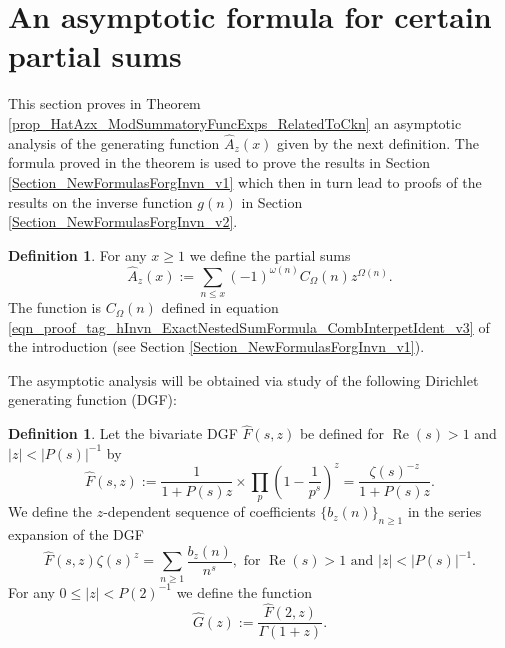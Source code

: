 \documentclass[11pt,reqno,a4letter]{article}
\newcommand{\hlocalref}[1]{\hyperref[#1]{\ref{#1}}}
\numberwithin{equation}{section}
\numberwithin{figure}{section}
\numberwithin{table}{section}
\theoremstyle{plain}
\numberwithin{theorem}{section}
\theoremstyle{definition}
\newtheorem{definition}[theorem]{Definition}
\renewcommand{\Re}{\operatorname{Re}}
\begin{document}
\section{An asymptotic formula for certain partial sums}

This section proves in 
Theorem \hlocalref{prop_HatAzx_ModSummatoryFuncExps_RelatedToCkn} 
an asymptotic analysis of the generating function $\widehat{A}_z(x)$ 
given by the next definition. The formula proved in the theorem is 
used to prove the results in 
Section \hlocalref{Section_NewFormulasForgInvn_v1} which then in turn 
lead to proofs of the results on the inverse function $g(n)$ in 
Section \hlocalref{Section_NewFormulasForgInvn_v2}. 

\begin{definition}
\label{def_PartialSumsOfCvlFunc_HatAzx_v1} 
For any $x \geq 1$ we define the partial sums 
\[
\widehat{A}_z(x) := \sum_{n \leq x} (-1)^{\omega(n)} 
     C_{\Omega}(n) z^{\Omega(n)}. 
\]
The function is $C_{\Omega}(n)$ defined in equation 
\eqref{eqn_proof_tag_hInvn_ExactNestedSumFormula_CombInterpetIdent_v3} 
of the introduction (see 
Section \hlocalref{Section_NewFormulasForgInvn_v1}). 
\end{definition}

The asymptotic analysis will be obtained via study of the following 
Dirichlet generating function (DGF):

\begin{definition}
\label{def_BivariateDGF_HatFsz_AndRelatedFuncs_v1}
Let the bivariate DGF $\widehat{F}(s, z)$ be defined 
for $\Re(s) > 1$ and $|z| < |P(s)|^{-1}$ by 
\[
\widehat{F}(s, z) := \frac{1}{1+P(s) z} 
     \times \prod_p \left(1 - \frac{1}{p^s}\right)^{z} = 
     \frac{\zeta(s)^{-z}}{1+P(s) z}. 
\]
We define the $z$-dependent sequence of coefficients $\{b_z(n)\}_{n \geq 1}$ in the 
series expansion of the DGF 
\[
\widehat{F}(s, z) \zeta(s)^{z} = \sum_{n \geq 1} \frac{b_z(n)}{n^s}, \text{ for } 
     \Re(s) > 1 \text{ and } |z| < |P(s)|^{-1}. 
\]
For any $0 \leq |z| < P(2)^{-1}$ we define the function 
\begin{equation}
\label{eqn_def_HatGz_v2}
\widehat{G}(z) := \frac{\widehat{F}(2, z)}{\Gamma(1+z)}. 
\end{equation}
\end{definition}
\end{document}

